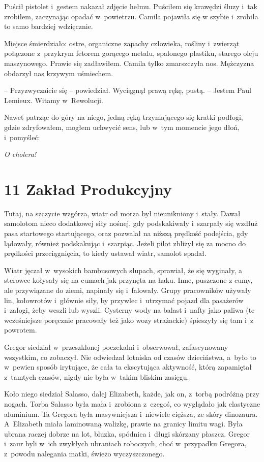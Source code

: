 \documentclass[oneside,polish,12pt,sfheadings]{mwbk}
\begin{document}
Puścił pistolet i~gestem nakazał zdjęcie hełmu. Puściłem się krawędzi
śluzy i~tak zrobiłem, zaczynając opadać w~powietrzu. Camila pojawiła się
w szybie i~zrobiła to samo bardziej wdzięcznie.

Miejsce śmierdziało: ostre, organiczne zapachy człowieka, rośliny i~zwierząt połączone z~przykrym fetorem gorącego metalu, spalonego
plastiku, starego oleju maszynowego. Prawie się zadławiłem. Camila tylko
zmarszczyła nos. Mężczyzna obdarzył nas krzywym uśmiechem.

-- Przyzwyczaicie się -- powiedział. Wyciągnął prawą rękę, pustą. -- Jestem
Paul Lemieux. Witamy w~Rewolucji.

Nawet patrząc do góry na niego, jedną ręką trzymającego się kratki
podłogi, gdzie zdryfowałem, mogłem uchwycić sens, lub w~tym momencie
jego dłoń, i~pomyśleć:

\emph{O cholera!}



\chapter[Zakład Produkcyjny]{11 Zakład Produkcyjny}

Tutaj, na szczycie wzgórza, wiatr od morza był nieunikniony i~stały.
Dawał samolotom nieco dodatkowej siły nośnej, gdy podskakiwały i~szarpały się wzdłuż pasa startowego startującego, oraz pozwalał na
niższą prędkość podejścia, gdy lądowały, również podskakując i~szarpiąc.
Jeżeli pilot zbliżył się za mocno do prędkości przeciągnięcia, to kiedy
ustawał wiatr, samolot spadał.

Wiatr jęczał w~wysokich bambusowych słupach, sprawiał, że się wyginały,
a sterowce kołysały się na cumach jak przynęta na haku. Inne, puszczone
z cumy, ale przywiązane do ziemi, napinały się i~falowały. Grupy
pracowników używały lin, kołowrotów i~głównie siły, by przywlec i~utrzymać pojazd dla pasażerów i~załogi, żeby weszli lub wyszli. Cysterny
wody na balast i~nafty jako paliwa (te wcześniejsze poręcznie pracowały
też jako wozy strażackie) śpieszyły się tam i~z powrotem.

Gregor siedział w~przeszklonej poczekalni i~obserwował, zafascynowany
wszystkim, co zobaczył. Nie odwiedzał lotniska od czasów dzieciństwa, a~było to w~pewien sposób irytujące, że cała ta ekscytująca aktywność,
którą zapamiętał z~tamtych czasów, nigdy nie była w~takim bliskim
zasięgu.

Koło niego siedział Salasso, dalej Elizabeth, każde, jak on, z~torbą
podróżną przy nogach. Torba Salasso była mała i~zrobiona z~czegoś, co
wyglądało jak elastyczne aluminium. Ta Gregora była masywniejsza i~niewiele cięższa, ze skóry dinozaura. A~Elizabeth miała laminowaną
walizkę, prawie na granicy limitu wagi. Była ubrana raczej dobrze na
lot, bluzka, spódnica i~długi skórzany płaszcz. Gregor i~zaur byli w~ich
zwykłych ubraniach roboczych, choć w~przypadku Gregora, z~powodu
nalegania matki, świeżo wyczyszczonego.
\end{document}
